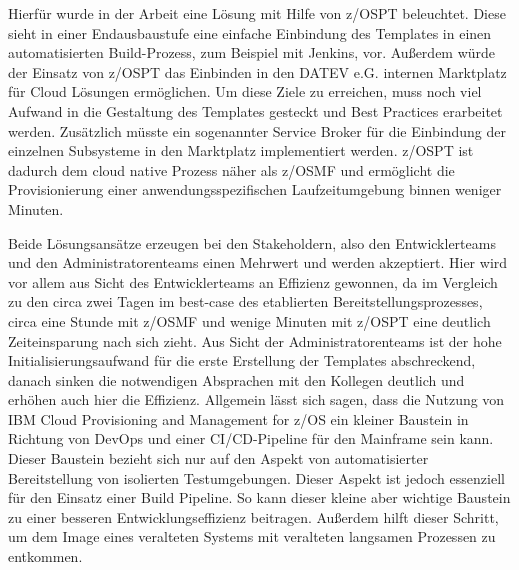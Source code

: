 Hierfür wurde in der Arbeit eine Lösung mit Hilfe von z/OSPT beleuchtet.
Diese sieht in einer Endausbaustufe eine einfache Einbindung des Templates in einen automatisierten Build-Prozess, zum Beispiel mit Jenkins, vor.
Außerdem würde der Einsatz von z/OSPT das Einbinden in den DATEV e.G. internen \glqq Marktplatz\grqq{} für Cloud Lösungen ermöglichen.
Um diese Ziele zu erreichen, muss noch viel Aufwand in die Gestaltung des Templates gesteckt und Best Practices erarbeitet werden.
Zusätzlich müsste ein sogenannter \glqq Service Broker\grqq{} für die Einbindung der einzelnen Subsysteme in den \glqq Marktplatz\grqq{} implementiert werden.
z/OSPT ist dadurch dem cloud native Prozess näher als z/OSMF und ermöglicht die Provisionierung einer anwendungsspezifischen Laufzeitumgebung binnen weniger Minuten.

Beide Lösungsansätze erzeugen bei den Stakeholdern, also den Entwicklerteams und den Administratorenteams einen Mehrwert und werden akzeptiert.
Hier wird vor allem aus Sicht des Entwicklerteams an Effizienz gewonnen, da im Vergleich zu den circa zwei Tagen im best-case des etablierten Bereitstellungsprozesses, circa eine Stunde mit z/OSMF und wenige Minuten mit z/OSPT eine deutlich Zeiteinsparung nach sich zieht.
Aus Sicht der Administratorenteams ist der hohe Initialisierungsaufwand für die erste Erstellung der Templates abschreckend, danach sinken die notwendigen Absprachen mit den Kollegen deutlich und erhöhen auch hier die Effizienz.
Allgemein lässt sich sagen, dass die Nutzung von \glqq IBM Cloud Provisioning and Management for z/OS\grqq{} ein kleiner Baustein in Richtung von DevOps und einer CI/CD-Pipeline für den Mainframe sein kann.
Dieser Baustein bezieht sich nur auf den Aspekt von automatisierter Bereitstellung von isolierten Testumgebungen.
Dieser Aspekt ist jedoch essenziell für den Einsatz einer Build Pipeline.
So kann dieser kleine aber wichtige Baustein zu einer besseren Entwicklungseffizienz beitragen.
Außerdem hilft dieser Schritt, um dem Image eines veralteten Systems mit veralteten langsamen Prozessen zu entkommen.

